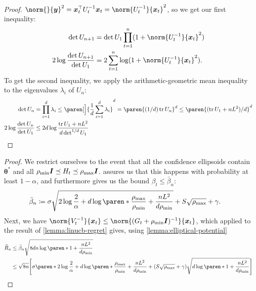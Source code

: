 \documentclass{article}
\renewcommand{\vec}[1]{\bm{#1}}
\newcommand{\defeq}{\coloneq}
\newcommand{\inv}[1]{#1^{-1}}
\newcommand{\tr}{\operatorname{tr}}
\renewcommand{\det}{\operatorname{det}}
\DeclarePairedDelimiter{\paren}()
\DeclarePairedDelimiter{\brck}{[}{]}
\providecommand\transp{\top}
\let\transpsymbol\transp
\renewcommand{\transp}[1]{#1^\transpsymbol}
\newcommand{\Eye}[1][]{\bm{I}\notblank{#1}{_{{#1}\times{#1}}}{}}
\begin{document}
\begin{proof}
  $\norm{}{\vec y}^2 = \transp{\vec x_t} \inv{U_t} \vec x_t =
  \norm{\inv{U_t}}{\vec x_t}^2$, so we get our first inequality:
  \begin{align*}
    \det U_{n+1} &= \det U_1 \prod_{t=1}^n(1 + \norm{\inv{U_t}}{\vec x_t}^2) \\
    2\log\frac{\det U_{n+1}}{\det U_1}
            &= 2\sum_{t=1}^n\log(1+\norm{\inv{U_t}}{\vec x_t}^2).
  \end{align*}
  To get the second inequality, we apply the arithmetic-geometric
  mean inequality to the eigenvalues $\lambda_i$ of $U_n$:
  \begin{align*}
    \det U_n &= \prod_{i=1}^d \lambda_i
              \le \paren[\Big]{\frac{1}{d} \sum_{i=1}^d \lambda_i}^d
              = \paren{(1/d)\tr U_n}^d
              \le \paren{(\tr U_1 + nL^2)/d}^d \\
    2\log\frac{\det U_n}{\det U_1}
            &\le 2d \log\frac{\tr U_1 + nL^2}{d\det^{1/d}U_1}
              \qedhere
  \end{align*}
\end{proof}

\ThmLinUCBRegret*

\begin{proof}
  We restrict ourselves to the event that all the confidence
  ellipsoids contain $\vec\theta^*$ and all
  $\rho_{\min}\Eye \preceq H_t \preceq \rho_{\max}\Eye$.
   assures us that this happens with probability at least
  $1-\alpha$, and furthermore gives us the bound $\beta_t \le \bar\beta_n$:
  \begin{align*}
    \bar\beta_n &\defeq \sigma\sqrt{2\log\frac{2}{\alpha} + d\log\paren*{\frac{\rho_{\max}}{\rho_{\min}}
                 + \frac{nL^2}{d\rho_{\min}}}}
                 + S\sqrt{\rho_{\max}} + \gamma.
  \end{align*}
  Next, we have
  $\norm{\inv{V_t}}{\vec x_t} \le
  \norm{\inv{(G_t+\rho_{\min}\Eye)}}{\vec x_t}$, which applied to the
  result of \cref{lemma:linucb-regret} gives, using
  \cref{lemma:elliptical-potential}
  \begin{align*}
    \widehat{R}_n
    &\le \bar\beta_n\sqrt{8dn\log\paren*{1+\frac{nL^2}{d\rho_{\min}}}} \\
    &\le \sqrt{8n}\brck*{\sigma\paren*{2\log\frac{2}{\alpha}
      + d\log\paren*{\frac{\rho_{\max}}{\rho_{\min}} + \frac{nL^2}{d\rho_{\min}}}}
      + (S\sqrt{\rho_{\max}}+\gamma)\sqrt{d\log\paren*{1+\frac{nL^2}{d\rho_{\min}}}}} \qedhere
  \end{align*}
\end{proof}
\end{document}
